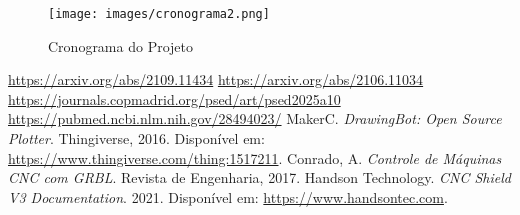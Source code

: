 \documentclass[a4paper,12pt]{article}
\begin{document}
\vspace{1em}  

\begin{figure}[H]  
    \centering  
    \texttt{[image: images/cronograma2.png]}   
    \caption{Cronograma do Projeto}  
    \label{fig:cronograma_projeto}  
\end{figure}  

\vspace{1em}  

\begin{thebibliography}{9}  
 \href{https://arxiv.org/abs/2109.11434}{https://arxiv.org/abs/2109.11434}  
 \href{https://arxiv.org/abs/2106.11034}{https://arxiv.org/abs/2106.11034}  
 \href{https://journals.copmadrid.org/psed/art/psed2025a10}{https://journals.copmadrid.org/psed/art/psed2025a10}  
 \href{https://pubmed.ncbi.nlm.nih.gov/28494023/}{https://pubmed.ncbi.nlm.nih.gov/28494023/}  
 MakerC. \textit{DrawingBot: Open Source Plotter}. Thingiverse, 2016. Disponível em: \url{https://www.thingiverse.com/thing:1517211}.  
 Conrado, A. \textit{Controle de Máquinas CNC com GRBL}. Revista de Engenharia, 2017.  
 Handson Technology. \textit{CNC Shield V3 Documentation}. 2021. Disponível em: \url{https://www.handsontec.com}.  
\end{thebibliography}  
\end{document}
